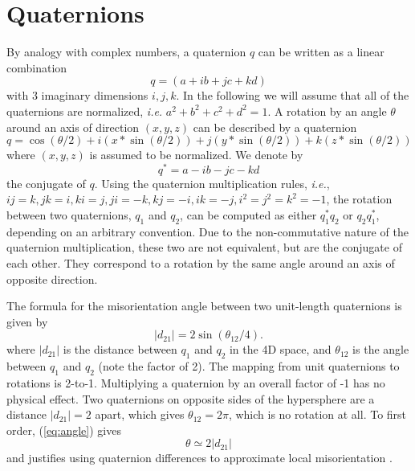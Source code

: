 %
\section{Quaternions}
\label{sec:quaternions}

By analogy with complex numbers, a quaternion $q$ can be written as a
linear combination
%
\begin{equation}
  q = (a+ib+jc+kd)
\end{equation}
%
with 3 imaginary dimensions $i,j,k$.  In the following we will assume
that all of the quaternions are normalized, {\it i.e.}
$a^2+b^2+c^2+d^2=1$.  A rotation by an angle $\theta$ around an axis
of direction $(x,y,z)$ can be described by a quaternion
%
\begin{equation}
  q=\cos(\theta/2)+i(x*\sin(\theta/2))+j(y*\sin(\theta/2))+k(z*\sin(\theta/2))
\end{equation}
%
where $(x,y,z)$ is assumed to be normalized.  We denote by
%
\begin{equation}
  q^*=a-ib-jc-kd
\end{equation}
%
the conjugate of $q$.  Using the quaternion multiplication
rules, {\em i.e.}, $ij = k, jk = i, ki = j, ji = -k, kj = -i, ik = -j, i^2 =
j^2 = k^2 = -1$, the rotation between two quaternions, $q_1$ and
$q_2$, can be computed as either $q_1^* q_2$ or $q_2 q_1^*$, depending
on an arbitrary convention.  Due to the non-commutative nature of the
quaternion multiplication, these two are not equivalent, but are the
conjugate of each other.  They correspond to a rotation by the same
angle around an axis of opposite direction.

The formula for the misorientation angle between two unit-length
quaternions is given by
%
\begin{equation}
  |d_{21}| = 2\sin(\theta_{12}/4).
\label{eq:angle}
\end{equation}
%
where $|d_{21}|$ is the distance between $q_1$ and $q_2$ in the 4D
space, and $\theta_{12}$ is the angle between $q_1$ and $q_2$ (note
the factor of 2).  The mapping from unit quaternions to rotations is
2-to-1.  Multiplying a quaternion by an overall factor of -1 has no
physical effect.  Two quaternions on opposite sides of the hypersphere
are a distance $|d_{21}| = 2$ apart, which gives $\theta_{12} = 2\pi$,
which is no rotation at all.  To first order, (\ref{eq:angle}) gives
%
\begin{equation}
   \theta\simeq 2|d_{21}|
\end{equation}
%
and justifies using quaternion differences to approximate local
misorientation \cite{0295-5075-71-1-131}.

